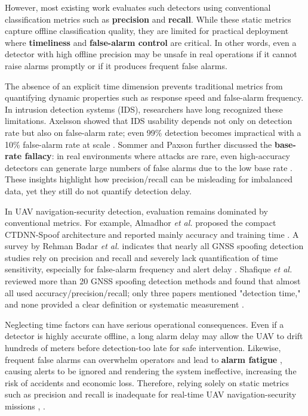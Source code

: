 \documentclass{ieeeaccess}
\begin{document}
However, most existing work evaluates such detectors using conventional classification metrics such as \textbf{precision} and \textbf{recall}. While these static metrics capture offline classification quality, they are limited for practical deployment where \textbf{timeliness} and \textbf{false-alarm control} are critical. In other words, even a detector with high offline precision may be unsafe in real operations if it cannot raise alarms promptly or if it produces frequent false alarms.

The absence of an explicit time dimension prevents traditional metrics from quantifying dynamic properties such as response speed and false-alarm frequency. In intrusion detection systems (IDS), researchers have long recognized these limitations. Axelsson showed that IDS usability depends not only on detection rate but also on false-alarm rate; even 99\% detection becomes impractical with a 10\% false-alarm rate at scale \cite{ref10}. Sommer and Paxson further discussed the \textbf{base-rate fallacy}: in real environments where attacks are rare, even high-accuracy detectors can generate large numbers of false alarms due to the low base rate \cite{ref11}. These insights highlight how precision/recall can be misleading for imbalanced data, yet they still do not quantify detection delay.

In UAV navigation-security detection, evaluation remains dominated by conventional metrics. For example, Almadhor \textit{et al.} proposed the compact CTDNN-Spoof architecture and reported mainly accuracy and training time \cite{ref12}. A survey by Rehman Badar \textit{et al.} indicates that nearly all GNSS spoofing detection studies rely on precision and recall and severely lack quantification of time sensitivity, especially for false-alarm frequency and alert delay \cite{ref9}. Shafique \textit{et al.} reviewed more than 20 GNSS spoofing detection methods and found that almost all used accuracy/precision/recall; only three papers mentioned "detection time," and none provided a clear definition or systematic measurement \cite{ref13}.

Neglecting time factors can have serious operational consequences. Even if a detector is highly accurate offline, a long alarm delay may allow the UAV to drift hundreds of meters before detection-too late for safe intervention. Likewise, frequent false alarms can overwhelm operators and lead to \textbf{alarm fatigue} \cite{ref14}, causing alerts to be ignored and rendering the system ineffective, increasing the risk of accidents and economic loss. Therefore, relying solely on static metrics such as precision and recall is inadequate for real-time UAV navigation-security missions \cite{ref9}, \cite{ref15}.
\end{document}
